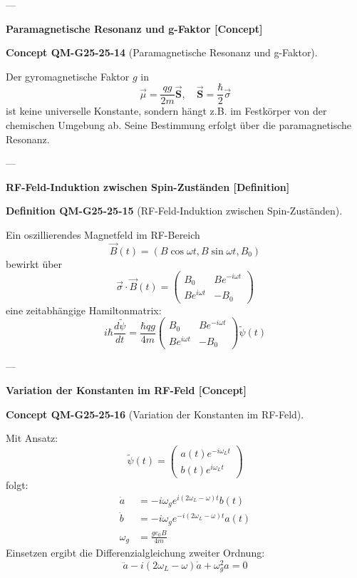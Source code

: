 \documentclass[10pt, letterpaper]{article}
\newcommand{\CustomHeading}[3]{%
  \par\medskip\noindent%
  \textbf{#1 #2} \textnormal{(#3)}.\enskip%
}
\newenvironment{DEF}[2]{\begin{unitbox}\CustomHeading{Definition}{#1}{#2}}{\end{unitbox}}
\newenvironment{CONC}[2]{\begin{unitbox}\CustomHeading{Concept}{#1}{#2}}{\end{unitbox}}
\begin{document}
---

\textbf{Paramagnetische Resonanz und g-Faktor [Concept]}

\begin{CONC}{QM-G25-25-14}{Paramagnetische Resonanz und g-Faktor}
Der gyromagnetische Faktor \( g \) in
\[
\vec{\mu} = \frac{q g}{2m} \vec{\mathbf{S}}, \quad \vec{\mathbf{S}} = \frac{\hbar}{2} \vec{\sigma}
\]
ist keine universelle Konstante, sondern hängt z.B. im Festkörper von der chemischen Umgebung ab. Seine Bestimmung erfolgt über die paramagnetische Resonanz.
\end{CONC}

---

\textbf{RF-Feld-Induktion zwischen Spin-Zuständen [Definition]}

\begin{DEF}{QM-G25-25-15}{RF-Feld-Induktion zwischen Spin-Zuständen}
Ein oszillierendes Magnetfeld im RF-Bereich
\[
\vec{B}(t) = \left( B \cos \omega t, B \sin \omega t, B_0 \right)
\]
bewirkt über
\[
\vec{\sigma} \cdot \vec{B}(t)
= \begin{pmatrix} B_0 & B e^{-i\omega t} \\ B e^{i\omega t} & -B_0 \end{pmatrix}
\]
eine zeitabhängige Hamiltonmatrix:
\[
i \hbar \frac{d \tilde{\psi}}{dt}
= \frac{\hbar q g}{4m}
\begin{pmatrix} B_0 & B e^{-i\omega t} \\ B e^{i\omega t} & -B_0 \end{pmatrix}
\tilde{\psi}(t)
\]
\end{DEF}

---

\textbf{Variation der Konstanten im RF-Feld [Concept]}

\begin{CONC}{QM-G25-25-16}{Variation der Konstanten im RF-Feld}
Mit Ansatz:
\[
\tilde{\psi}(t) =
\begin{pmatrix}
a(t) e^{-i\omega_L t} \\
b(t) e^{i\omega_L t}
\end{pmatrix}
\]
folgt:
\[
\begin{aligned}
\dot{a} &= -i \omega_g e^{i(2\omega_L - \omega)t} b(t) \\
\dot{b} &= -i \omega_g e^{-i(2\omega_L - \omega)t} a(t) \\
\omega_g &= \frac{g e_0 B}{4 m}
\end{aligned}
\]
Einsetzen ergibt die Differenzialgleichung zweiter Ordnung:
\[
\ddot{a} - i(2\omega_L - \omega)\dot{a} + \omega_g^2 a = 0
\]
\end{CONC}
\end{document}
